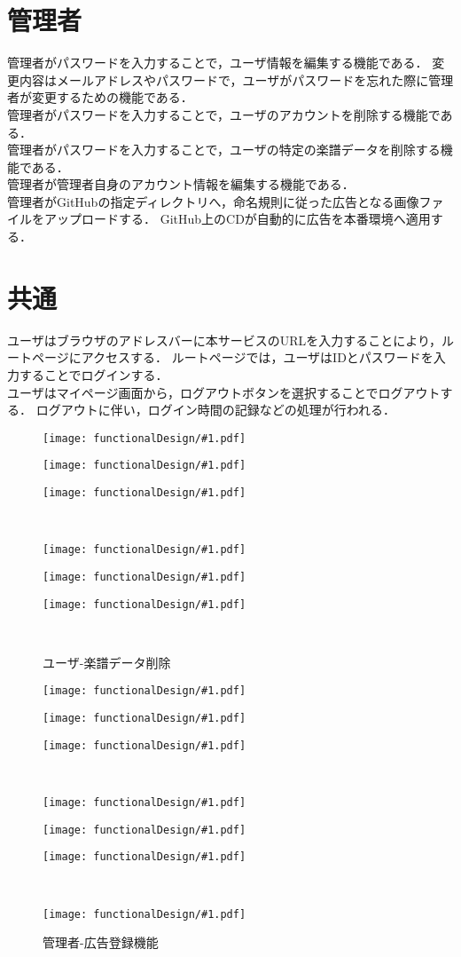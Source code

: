 \section{管理者}
管理者がパスワードを入力することで，ユーザ情報を編集する機能である．
変更内容はメールアドレスやパスワードで，ユーザがパスワードを忘れた際に管理者が変更するための機能である．\\
管理者がパスワードを入力することで，ユーザのアカウントを削除する機能である．\\
管理者がパスワードを入力することで，ユーザの特定の楽譜データを削除する機能である．\\
管理者が管理者自身のアカウント情報を編集する機能である．\\
管理者がGitHubの指定ディレクトリへ，命名規則に従った広告となる画像ファイルをアップロードする．
GitHub上のCDが自動的に広告を本番環境へ適用する．
\section{共通}
ユーザはブラウザのアドレスバーに本サービスのURLを入力することにより，ルートページにアクセスする．
ルートページでは，ユーザはIDとパスワードを入力することでログインする．\\
ユーザはマイページ画面から，ログアウトボタンを選択することでログアウトする．
ログアウトに伴い，ログイン時間の記録などの処理が行われる．
\newcommand{\icd}[2]{\begin{minipage}[b]{.32\textwidth}\centering\texttt{[image: functionalDesign/\#1.pdf]}\caption{#2}\label{#2}\end{minipage}}
\begin{figure}[p]
    \centering
    \icd{211-機能設計-利用者側-ユーザ登録}{ユーザ-ユーザ登録}
    \icd{212-機能設計-利用者側-ユーザ編集}{ユーザ-ユーザ編集}
    \icd{213-機能設計-利用者側-ユーザ削除}{ユーザ-ユーザ削除}\\
    \icd{214-機能設計-利用者側-楽譜データ登録}{ユーザ-楽譜データ登録}
    \icd{215-機能設計-利用者側-楽譜データ編集}{ユーザ-楽譜データ編集}
    \icd{216-機能設計-利用者側-楽譜データ削除}{ユーザ-楽譜データ削除}\\
\end{figure}
\begin{figure}[p]
    \centering
    \icd{221-機能設計-管理者側-ユーザ編集}{管理者-ユーザ編集}
    \icd{222-機能設計-管理者側-ユーザ削除}{管理者-ユーザ削除}
    \icd{223-機能設計-管理者側-楽譜データ削除}{管理者-楽譜データ削除}\\
    \icd{224-機能設計-管理者側-管理者情報編集機能}{管理者-管理者情報編集}
    \icd{217-機能設計-利用者側-ログイン}{共通-ログイン}
    \icd{218-機能設計-利用者側-ログアウト}{共通-ログアウト}\\
    \icd{225-機能設計-管理者側-広告登録機能}{管理者-広告登録機能}
\end{figure}